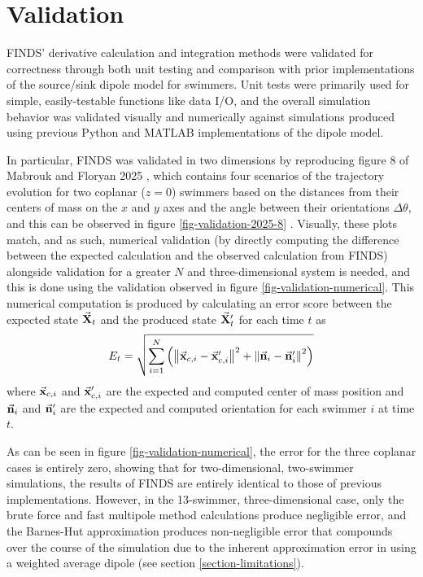 \documentclass[letterpaper, 10pt, twoside]{LTJournalArticle}
\begin{document}
\section{Validation}
\label{section-validation}

FINDS' derivative calculation and integration methods were validated for
correctness through both unit testing and comparison with prior implementations
of the source/sink dipole model for swimmers. Unit tests were primarily used
for simple, easily-testable functions like data I/O, and the overall simulation
behavior was validated visually and numerically against simulations produced
using previous Python and MATLAB implementations of the dipole model.

In particular, FINDS was validated in two dimensions by reproducing figure 8 of
Mabrouk and Floryan 2025 \cite{mabrouk_floryan_2025}, which contains four
scenarios of the trajectory evolution for two coplanar ($z=0$) swimmers based
on the distances from their centers of mass on the $x$ and $y$ axes and the
angle between their orientations $\Delta \theta$, and this can be observed in
figure \ref{fig-validation-2025-8} \cite{mabrouk_floryan_2025}. Visually, these
plots match, and as such, numerical validation (by directly computing the
difference between the expected calculation and the observed calculation from
FINDS) alongside validation for a greater $N$ and three-dimensional system is
needed, and this is done using the validation observed in figure
\ref{fig-validation-numerical}. This numerical computation is produced by
calculating an error score between the expected state
$\va{X}_t$ and the produced state $\va{X}_t'$ for each time $t$ as
\begin{equation}\label{eq-validation-err}
  E_t = \sqrt{\sum_{i=1}^{N} \left( \norm{\va{x}_{c,i} - \va{x}_{c,i}'}^2 +
    \norm{\va{n}_i - \va{n}_i'}^2 \right)}
\end{equation}
where $\va{x}_{c,i}$ and $\va{x}_{c,i}'$ are the expected and computed center
of mass position and $\va{n}_i$ and $\va{n}_i'$ are the expected and computed
orientation for each swimmer $i$ at time $t$.

As can be seen in figure \ref{fig-validation-numerical}, the error for the
three coplanar cases is entirely zero, showing that for two-dimensional,
two-swimmer simulations, the results of FINDS are entirely identical to those of
previous implementations. However, in the 13-swimmer, three-dimensional case,
only the brute force and fast multipole method calculations produce negligible
error, and the Barnes-Hut approximation produces non-negligible error that
compounds over the course of the simulation due to the inherent approximation
error in using a weighted average dipole (see section
\ref{section-limitations}).
\end{document}
